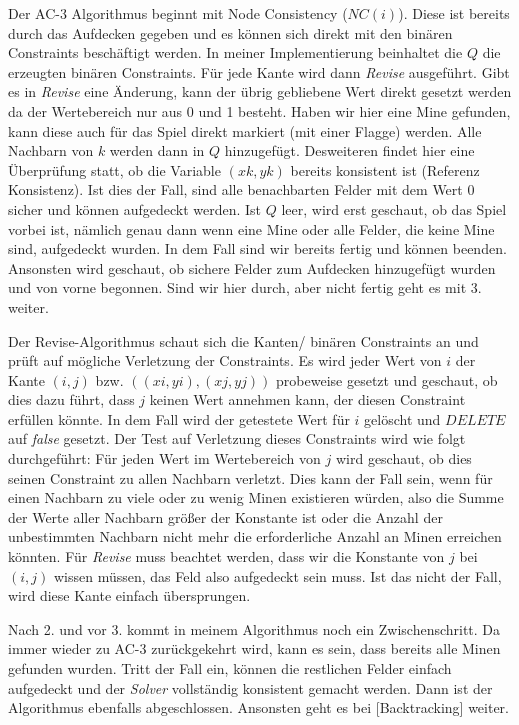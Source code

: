 Der AC-3 Algorithmus beginnt mit Node Consistency ($NC(i)$). Diese ist bereits durch das Aufdecken gegeben und es können sich direkt mit den
binären Constraints beschäftigt werden. In meiner Implementierung beinhaltet die $Q$ die erzeugten binären Constraints. Für jede Kante wird
dann \textit{Revise} ausgeführt. Gibt es in \textit{Revise} eine Änderung, kann der übrig gebliebene Wert direkt gesetzt werden da der 
Wertebereich nur aus 0 und 1 besteht. Haben wir hier eine Mine gefunden, kann diese auch für das Spiel direkt markiert (mit einer Flagge)
werden. Alle Nachbarn von $k$ werden dann in $Q$ hinzugefügt. Desweiteren findet hier eine Überprüfung statt, ob die Variable $(xk, yk)$ bereits
konsistent ist (Referenz Konsistenz). Ist dies der Fall, sind alle benachbarten Felder mit dem Wert 0 sicher und können aufgedeckt werden.
Ist $Q$ leer, wird erst geschaut, ob das Spiel vorbei ist, nämlich genau dann wenn eine Mine oder alle Felder, die keine Mine sind, aufgedeckt
wurden. In dem Fall sind wir bereits fertig und können beenden. Ansonsten wird geschaut, ob sichere Felder zum Aufdecken hinzugefügt wurden
und von vorne begonnen. Sind wir hier durch, aber nicht fertig geht es mit 3. weiter.

Der Revise-Algorithmus schaut sich die Kanten/ binären Constraints an und prüft auf mögliche Verletzung der Constraints. Es wird jeder Wert
von $i$ der Kante $(i,j)$ bzw. $((xi, yi), (xj, yj))$ probeweise gesetzt und geschaut, ob dies dazu führt, dass $j$ keinen Wert annehmen kann,
der diesen Constraint erfüllen könnte. In dem Fall wird der getestete Wert für $i$ gelöscht und $DELETE$ auf \textit{false} gesetzt. Der Test
auf Verletzung dieses Constraints wird wie folgt durchgeführt: Für jeden Wert im Wertebereich von $j$ wird geschaut, ob dies seinen Constraint
zu allen Nachbarn verletzt. Dies kann der Fall sein, wenn für einen Nachbarn zu viele oder zu wenig Minen existieren würden, also die Summe
der Werte aller Nachbarn größer der Konstante ist oder die Anzahl der unbestimmten Nachbarn nicht mehr die erforderliche Anzahl an Minen 
erreichen könnten. 
Für \textit{Revise} muss beachtet werden, dass wir die Konstante von $j$ bei $(i,j)$ wissen müssen, das Feld also aufgedeckt sein muss. Ist
das nicht der Fall, wird diese Kante einfach übersprungen.

Nach 2. und vor 3. kommt in meinem Algorithmus noch ein Zwischenschritt. Da immer wieder zu AC-3 zurückgekehrt wird, kann es sein, dass bereits
alle Minen gefunden wurden. Tritt der Fall ein, können die restlichen Felder einfach aufgedeckt und der \textit{Solver} vollständig
konsistent gemacht werden. Dann ist der Algorithmus ebenfalls abgeschlossen. Ansonsten geht es bei [Backtracking] weiter.


